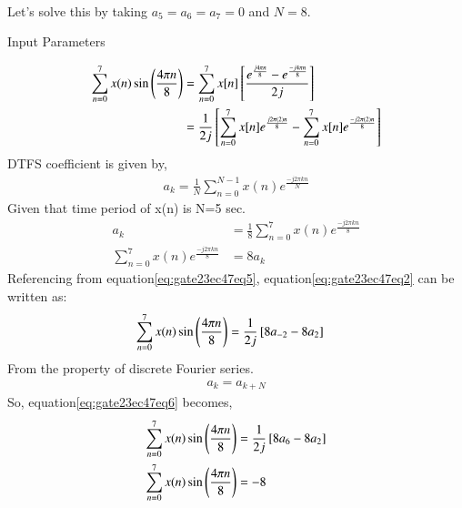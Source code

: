 \documentclass[journal,12pt,onecolumn]{IEEEtran}
\theoremstyle{remark}
\begin{document}
\solution\\
Let's solve this by taking $a_5=a_6=a_7=0$ and $N=8$.
\begin{table}[h]
 	\centering
 	\resizebox{6 cm}{!}{
 		
 	}
 	\vspace{6 pt}
 	\caption{Input Parameters}
 	\label{eq:gate23ec47tab1}
 \end{table} 
\begin{align}
\sum\limits_{n=0}^{7}x(n) \sin\left(\frac{4\pi n}{8}\right)&=\sum\limits_{n=0}^{7}x[n]{}\left[\frac{e^{\frac{j4\pi n}{8}}-e^{\frac{-j4\pi n}{8}}}{2j}\right]\label{eq:gate23ec47eq1}\\
&=\frac{1}{2j}{}\left[\sum\limits_{n=0}^{7}x[n]e^{\frac{j2\pi (2)n}{8}}-\sum\limits_{n=0}^{7}x[n]e^{\frac{-j2\pi (2)n}{8}}\right]\label{eq:gate23ec47eq2}
\end{align}
DTFS coefficient is given by,\\
\begin{align}
a_k=\frac{1}{N}\sum\limits_{n=0}^{N-1} x(n)e^{\frac{-j2\pi kn}{N}}\label{eq:gate23ec47eq3}
\end{align}
Given that time period of x(n) is N=5 sec.\\
\begin{align}
a_k&=\frac{1}{8}\sum\limits_{n=0}^{7} x(n)e^{\frac{-j2\pi kn}{8}}\label{eq:gate23ec47eq4}\\
\sum\limits_{n=0}^{7} x(n)e^{\frac{-j2\pi kn}{8}}&=8a_k\label{eq:gate23ec47eq5}
\end{align}
Referencing from equation\eqref{eq:gate23ec47eq5}, equation\eqref{eq:gate23ec47eq2} can be written as:
\begin{align}
\sum\limits_{n=0}^{7}x(n) \sin\left(\frac{4\pi n}{8}\right)&=\frac{1}{2j}{}\left[8a_{-2}-8a_2\right]\label{eq:gate23ec47eq6}
\end{align}
From the property of discrete Fourier series.\\
\begin{align}
a_k=a_{k+N}\label{eq:gate23ec47eq7}
\end{align}
So, equation\eqref{eq:gate23ec47eq6} becomes,\\
\begin{align}
\sum\limits_{n=0}^{7}x(n) \sin\left(\frac{4\pi n}{8}\right)&=\frac{1}{2j}{}\left[8a_6-8a_2\right]\label{eq:gate23ec47eq8}\\
\sum\limits_{n=0}^{7}x(n) \sin\left(\frac{4\pi n}{8}\right)&=-8\label{eq:gate23ec47eq9}
\end{align}
\end{document}
